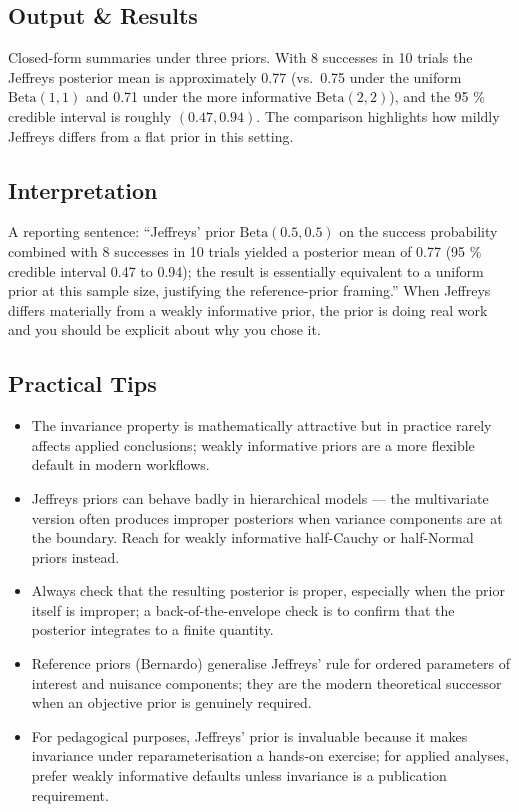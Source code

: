 \documentclass[
]{article}
\providecommand{\tightlist}{%
  \setlength{\itemsep}{0pt}\setlength{\parskip}{0pt}}
\begin{document}
\subsection{Output \& Results}\label{output-results}

Closed-form summaries under three priors. With 8 successes in 10 trials
the Jeffreys posterior mean is approximately 0.77 (vs.~0.75 under the
uniform \(\mathrm{Beta}(1, 1)\) and 0.71 under the more informative
\(\mathrm{Beta}(2, 2)\)), and the 95 \% credible interval is roughly
\((0.47, 0.94)\). The comparison highlights how mildly Jeffreys differs
from a flat prior in this setting.

\subsection{Interpretation}\label{interpretation}

A reporting sentence: ``Jeffreys' prior \(\mathrm{Beta}(0.5, 0.5)\) on
the success probability combined with 8 successes in 10 trials yielded a
posterior mean of 0.77 (95 \% credible interval 0.47 to 0.94); the
result is essentially equivalent to a uniform prior at this sample size,
justifying the reference-prior framing.'' When Jeffreys differs
materially from a weakly informative prior, the prior is doing real work
and you should be explicit about why you chose it.

\subsection{Practical Tips}\label{practical-tips}

\begin{itemize}
\tightlist
\item
  The invariance property is mathematically attractive but in practice
  rarely affects applied conclusions; weakly informative priors are a
  more flexible default in modern workflows.
\item
  Jeffreys priors can behave badly in hierarchical models --- the
  multivariate version often produces improper posteriors when variance
  components are at the boundary. Reach for weakly informative
  half-Cauchy or half-Normal priors instead.
\item
  Always check that the resulting posterior is proper, especially when
  the prior itself is improper; a back-of-the-envelope check is to
  confirm that the posterior integrates to a finite quantity.
\item
  Reference priors (Bernardo) generalise Jeffreys' rule for ordered
  parameters of interest and nuisance components; they are the modern
  theoretical successor when an objective prior is genuinely required.
\item
  For pedagogical purposes, Jeffreys' prior is invaluable because it
  makes invariance under reparameterisation a hands-on exercise; for
  applied analyses, prefer weakly informative defaults unless invariance
  is a publication requirement.
\end{itemize}
\end{document}
